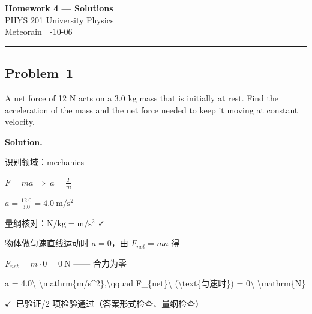 \documentclass[12pt, a4paper]{article}
\newcommand{\problem}[1]{\subsection*{Problem~#1}}
\newcommand{\solution}{%
  \par\noindent
  {\color{solutiongreen}\bfseries Solution.}\par
}
\newcommand{\verifyok}{\textcolor{solutiongreen}{\ensuremath{\checkmark}\ 已验证}}
\begin{document}
\begin{center}
  {\LARGE\bfseries Homework 4 — Solutions} \\[0.6em]
  {\large\color{solutionblue} PHYS 201 University Physics} \\[0.4em]
  Meteorain \quad | -10-06
\end{center}
\vspace{0.5em}\hrule\vspace{1.2em}
\problem{1}

\begin{stepbox}
A net force of 12 N acts on a 3.0 kg mass that is initially at rest.
Find the acceleration of the mass and the net force needed to keep it moving
at constant velocity.
\end{stepbox}

\solution

\begin{stepbox}
识别领域：mechanics
\end{stepbox}

\begin{stepbox}
$F = ma\ \Rightarrow\ a = \frac{F}{m}$
\end{stepbox}

\begin{stepbox}
$a = \frac{12.0}{3.0} = 4.0\ \mathrm{m/s^2}$
\end{stepbox}

\begin{stepbox}
量纲核对：$\mathrm{N/kg} = \mathrm{m/s^2}$ ✓
\end{stepbox}

\begin{stepbox}
物体做匀速直线运动时 $a = 0$，由 $F_{net}=ma$ 得
\end{stepbox}

\begin{stepbox}
$F_{net} = m\cdot 0 = 0\ \mathrm{N}$ —— 合力为零
\end{stepbox}

\begin{center}
a = 4.0\textbackslash{} \textbackslash{}mathrm\{m/s\textasciicircum{}2\},\textbackslash{}qquad F\_\{net\}\textbackslash{} (\textbackslash{}text\{匀速时\}) = 0\textbackslash{} \textbackslash{}mathrm\{N\}
\end{center}

\begin{verifybox}\small \verifyok{}/2 项检验通过（答案形式检查、量纲检查） \end{verifybox}
\end{document}
